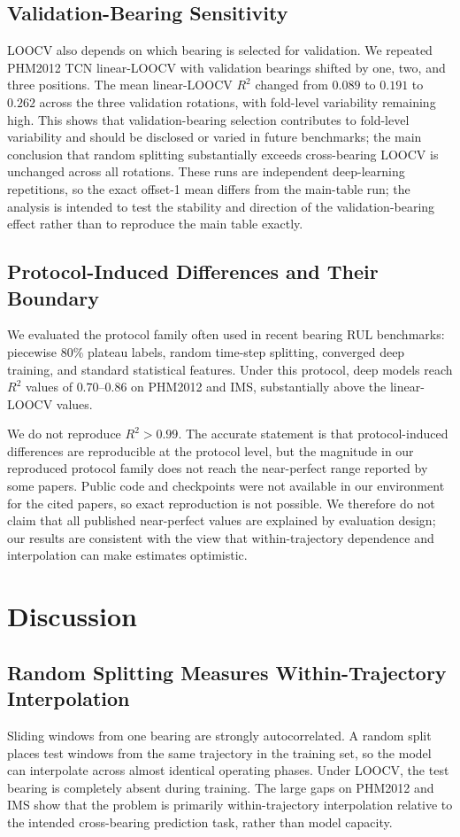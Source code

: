 \documentclass[pdflatex,sn-mathphys-num]{sn-jnl}
\begin{document}
\subsection{Validation-Bearing Sensitivity}
LOOCV also depends on which bearing is selected for validation. We repeated PHM2012 TCN linear-LOOCV with validation bearings shifted by one, two, and three positions. The mean linear-LOOCV $R^2$ changed from $0.089$ to $0.191$ to $0.262$ across the three validation rotations, with fold-level variability remaining high. This shows that validation-bearing selection contributes to fold-level variability and should be disclosed or varied in future benchmarks; the main conclusion that random splitting substantially exceeds cross-bearing LOOCV is unchanged across all rotations. These runs are independent deep-learning repetitions, so the exact offset-1 mean differs from the main-table run; the analysis is intended to test the stability and direction of the validation-bearing effect rather than to reproduce the main table exactly.

\subsection{Protocol-Induced Differences and Their Boundary}
We evaluated the protocol family often used in recent bearing RUL benchmarks: piecewise 80\% plateau labels, random time-step splitting, converged deep training, and standard statistical features. Under this protocol, deep models reach $R^2$ values of $0.70$--$0.86$ on PHM2012 and IMS, substantially above the linear-LOOCV values.

We do not reproduce $R^2>0.99$. The accurate statement is that protocol-induced differences are reproducible at the protocol level, but the magnitude in our reproduced protocol family does not reach the near-perfect range reported by some papers. Public code and checkpoints were not available in our environment for the cited papers, so exact reproduction is not possible. We therefore do not claim that all published near-perfect values are explained by evaluation design; our results are consistent with the view that within-trajectory dependence and interpolation can make estimates optimistic.

\section{Discussion}
\subsection{Random Splitting Measures Within-Trajectory Interpolation}
Sliding windows from one bearing are strongly autocorrelated. A random split places test windows from the same trajectory in the training set, so the model can interpolate across almost identical operating phases. Under LOOCV, the test bearing is completely absent during training. The large gaps on PHM2012 and IMS show that the problem is primarily within-trajectory interpolation relative to the intended cross-bearing prediction task, rather than model capacity.
\end{document}
